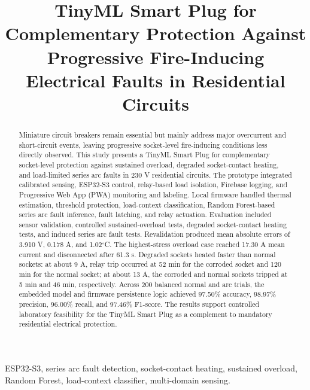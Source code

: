 \documentclass[conference,a4paper]{template/IEEEtran}
\begin{document}
\title{TinyML Smart Plug for Complementary Protection Against Progressive Fire-Inducing Electrical Faults in Residential Circuits}

\author{
}

\maketitle

\begin{abstract}
Miniature circuit breakers remain essential but mainly address major
overcurrent and short-circuit events, leaving progressive socket-level
fire-inducing conditions less directly observed. This study presents a
TinyML Smart Plug for complementary socket-level protection against sustained
overload, degraded socket-contact heating, and load-limited series arc faults
in 230 V residential circuits. The prototype integrated calibrated sensing,
ESP32-S3 control, relay-based load isolation, Firebase logging, and
Progressive Web App (PWA) monitoring and labeling. Local firmware handled
thermal estimation, threshold protection, load-context classification,
Random Forest-based series arc fault inference, fault latching, and relay actuation.
Evaluation included sensor validation, controlled sustained-overload tests,
degraded socket-contact heating tests, and induced series arc fault tests.
Revalidation produced mean absolute errors of
3.910 V, 0.178 A, and 1.02$^{\circ}$C. The highest-stress overload case
reached 17.30 A mean current and disconnected after 61.3 s. Degraded sockets
heated faster than normal sockets: at about 9 A, relay trip occurred at 52 min
for the corroded socket and 120 min for the normal socket; at about 13 A, the
corroded and normal sockets tripped at 5 min and 46 min, respectively. Across
200 balanced normal and arc trials, the embedded model and firmware
persistence logic achieved 97.50\% accuracy, 98.97\% precision, 96.00\%
recall, and 97.46\% F1-score. The results support controlled laboratory
feasibility for the TinyML Smart Plug as a complement to mandatory residential
electrical protection.
\end{abstract}

\begin{IEEEkeywords}
ESP32-S3, series arc fault detection, socket-contact heating, sustained overload,
Random Forest, load-context classifier, multi-domain sensing.
\end{IEEEkeywords}
\end{document}
